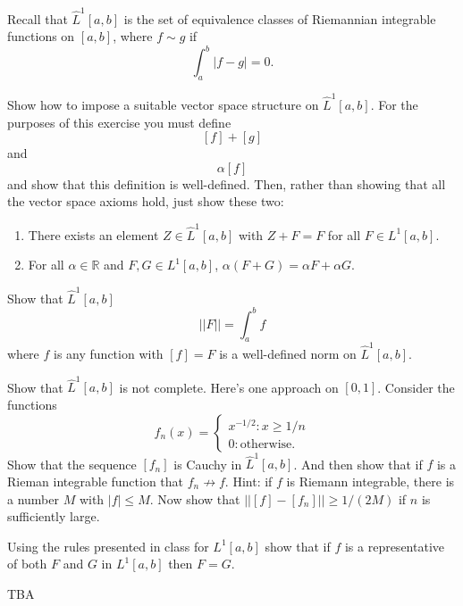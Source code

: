 \documentclass[minion]{homework}
\newcommand{\Reals}{\mathbb{R}}
\begin{document}
\begin{aproblems}

Recall that $\hat L^1[a,b]$ is the set of equivalence classes
of Riemannian integrable functions on $[a,b]$, where $f\sim g$ if
\[
\int_a^b |f-g| = 0.
\]

\hproblem Show how to impose a suitable vector space structure
on $\hat L^1[a,b]$.  For the purposes of this exercise you must define
\[
[f]+[g]
\]
and
\[
\alpha[f]
\]
and show that this definition is well-defined.  Then, rather than showing
that all the vector space axioms hold, just show these two:
\begin{enumerate}
	\item There exists an element $Z\in \hat L^1[a,b]$ with $Z+F=F$ for
	all $F\in L^1[a,b]$.
	\item For all $\alpha\in\Reals$ and $F,G\in L^1[a,b]$, $\alpha(F+G)=\alpha F + \alpha G$.
\end{enumerate}

\hproblem Show that $\hat L^1[a,b]$
\[
||F|| = \int_a^b f
\]
where $f$ is any function with $[f]=F$ is a well-defined norm on $\hat L^1[a,b]$.

\hproblem Show that $\hat L^1[a,b]$ is not complete.  Here's one approach on $[0,1]$.  Consider the functions
\[
f_n(x) = \begin{cases} x^{-1/2} : x\ge 1/n\\
0 : \text{otherwise}.
\end{cases}
\]
Show that the sequence $[f_n]$ is Cauchy in $\hat L^1[a,b]$.  And then
show that if $f$ is a Rieman integrable function that $f_n\not\to f$.
Hint: if $f$ is Riemann integrable, there is a number $M$ with $|f|\le M$.
Now show that $||[f]-[f_n]||\ge 1/(2M)$ if $n$ is sufficiently large. 

\hproblem Using the rules presented in class for $L^1[a,b]$ show that if $f$ is
a representative of both $F$ and $G$ in $L^1[a,b]$ then $F=G$.

\hproblem TBA

\end{aproblems}
\end{document}
